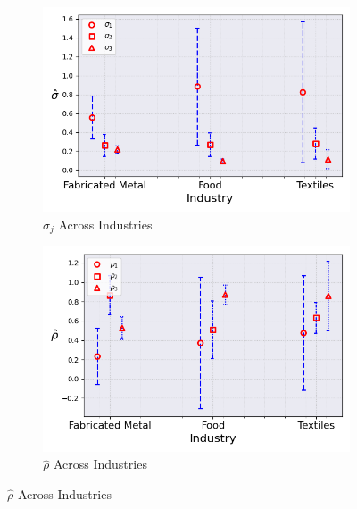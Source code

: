 \documentclass{article}
\begin{document}
\begin{figure}[ht!]
\begin{subfigure}[t]{0.32\textwidth}
        \includegraphics[width=\textwidth]{figure/ar1_normal_sigma_across_industries_m3.png}
        \caption{$\hat\sigma_j$ Across Industries}
    \end{subfigure}
    \begin{subfigure}[t]{0.32\textwidth}
        \centering
        \includegraphics[width=\textwidth]{figure/ar1_normal_rho_across_industries_m3.png}
        \caption{$\hat\rho$ Across Industries}
    \end{subfigure}
\end{figure}
\end{document}
